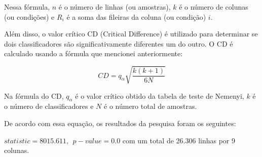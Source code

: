 Nessa fórmula, $n$ é o número de linhas (ou amostras), $k$ é o número de colunas (ou condições) e $R_i$ é a soma das fileiras da coluna (ou condição) $i$.

Além disso, o valor crítico CD (Critical Difference) é utilizado para determinar se dois classificadores são significativamente diferentes um do outro. O CD é calculado usando a fórmula que mencionei anteriormente:

\begin{equation}
	CD = q_\alpha \sqrt{\frac{k(k+1)}{6N}}
\end{equation}

Na fórmula do CD, $q_\alpha$ é o valor crítico obtido da tabela de teste de Nemenyi, $k$ é o número de classificadores e $N$ é o número total de amostras.

De acordo com essa equação, os resultados da pesquisa foram os seguintes:

$statistic=8015.611,\ \ p-value=0.0$ com um total de 26.306 linhas por 9 colunas.
